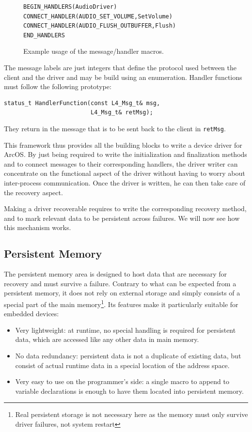 \documentclass{acm_proc_article-sp}
\begin{document}
\begin{figure}[ht]
\centering
\begin{screen}
\begin{verbatim}
BEGIN_HANDLERS(AudioDriver)
CONNECT_HANDLER(AUDIO_SET_VOLUME,SetVolume)
CONNECT_HANDLER(AUDIO_FLUSH_OUTBUFFER,Flush)
END_HANDLERS
\end{verbatim}
\end{screen}
\caption{Example usage of the message/handler macros.}
\label{fig:connectors}
\end{figure}

The message labels are just integers that define the protocol used between the client and the driver and may be build using an enumeration. Handler functions must follow the following prototype:
\begin{verbatim}
status_t HandlerFunction(const L4_Msg_t& msg,
                         L4_Msg_t& retMsg);
\end{verbatim}
They return in the message that is to be sent back to the client in \texttt{retMsg}.

This framework thus provides all the building blocks to write a device driver for ArcOS. By just being required to write the initialization and finalization methods and to connect messages to their corresponding handlers, the driver writer can concentrate on the functional aspect of the driver without having to worry about inter-process communication. Once the driver is written, he can then take care of the recovery aspect.

Making a driver recoverable requires to write the corresponding recovery method, and to mark relevant data to be persistent across failures. We will now see how this mechanism works.


\subsection{Persistent Memory}
The persistent memory area is designed to host data that are necessary for recovery and must survive a failure. Contrary to what can be expected from a persistent memory, it does not rely on external storage and simply consists of a special part of the main memory\footnote{Real persistent storage is not necessary here as the memory must only survive driver failures, not system restart}. Its features make it particularly suitable for embedded devices:
\begin{itemize}
\item Very lightweight: at runtime, no special handling is required for persistent data, which are accessed like any other data in main memory.
\item No data redundancy: persistent data is not a duplicate of existing data, but consist of actual runtime data in a special location of the address space.
\item Very easy to use on the programmer's side: a single macro to append to variable declarations is enough to have them located into persistent memory.
\end{itemize}
\end{document}
